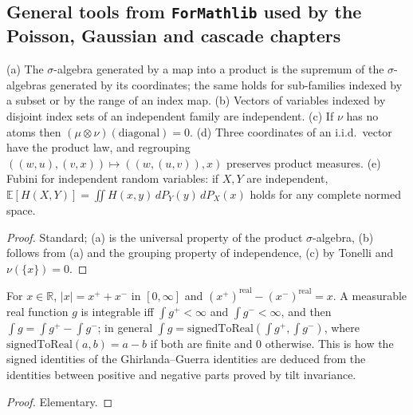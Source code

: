 \subsection*{General tools from \texttt{ForMathlib} used by the Poisson, Gaussian and cascade chapters}

\begin{lemma}\label{lem:sg:indep-tools}
  \leanok
(a) The $\sigma$-algebra generated by a map into a product is the supremum of the $\sigma$-algebras generated by its coordinates; the same holds for sub-families
indexed by a subset or by the range of an index map.
(b) Vectors of variables indexed by disjoint index sets of an independent family are independent.
(c) If $\nu$ has no atoms then $(\mu\otimes\nu)(\text{diagonal})=0$.
(d) Three coordinates of an i.i.d.\ vector have the product law, and regrouping $((w,u),(v,x))\mapsto((w,(u,v)),x)$ preserves product measures.
(e) Fubini for independent random variables: if $X, Y$ are independent, $\mathbb E[H(X, Y)] = \iint H(x, y) \, dP_Y(y) \, dP_X(x)$ holds for any complete normed space.
\end{lemma}
\begin{proof}
  \leanok
Standard; (a) is the universal property of the product $\sigma$-algebra, (b) follows from (a) and the grouping property of independence, (c) by Tonelli and $\nu(\{x\})=0$.
\end{proof}

\begin{lemma}\label{lem:sg:signed-to-real}
  \leanok
For $x\in\mathbb R$, $|x|=x^++x^-$ in $[0,\infty]$ and $(x^+)^{\mathrm{real}}-(x^-)^{\mathrm{real}}=x$. A measurable real function $g$ is integrable iff $\int g^+<\infty$ and $\int g^-<\infty$, and then
$\int g=\int g^+-\int g^-$; in general $\int g=\mathrm{signedToReal}(\int g^+,\int g^-)$, where $\mathrm{signedToReal}(a,b)=a-b$ if both are finite and $0$ otherwise.
This is how the signed identities of the Ghirlanda--Guerra identities are deduced from the identities between positive and negative parts proved by tilt invariance.
\end{lemma}
\begin{proof}
  \leanok
Elementary.
\end{proof}

